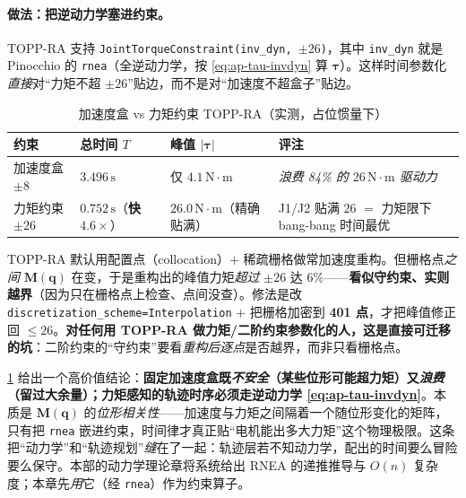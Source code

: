 \paragraph{做法：把逆动力学塞进约束。}
TOPP-RA 支持 \texttt{JointTorqueConstraint(inv\_dyn, $\pm 26$)}，其中 \texttt{inv\_dyn} 就是 Pinocchio 的 \texttt{rnea}（全逆动力学，按 \cref{eq:ap-tau-invdyn} 算 $\boldsymbol{\tau}$）。这样时间参数化\emph{直接}对“力矩不超 $\pm 26$”贴边，而不是对“加速度不超盒子”贴边。

\begin{table}[H]\centering\small
\caption{加速度盒 vs 力矩约束 TOPP-RA（实测，占位惯量下）}
\begin{tabular}{p{} p{} p{} p{}}
\toprule
约束 & 总时间 $T$ & 峰值 $|\boldsymbol{\tau}|$ & 评注 \\
\midrule
加速度盒 $\pm 8$ & $3.496\,\mathrm{s}$ & 仅 $4.1\,\mathrm{N\!\cdot\! m}$ & \emph{浪费 84\% 的 $26\,\mathrm{N\!\cdot\! m}$ 驱动力} \\
力矩约束 $\pm 26$ & $0.752\,\mathrm{s}$（\textbf{快 $4.6\times$}）& $26.0\,\mathrm{N\!\cdot\! m}$（精确贴满）& J1/J2 贴满 $26$ $=$ 力矩限下 bang-bang 时间最优 \\
\bottomrule
\end{tabular}
\label{tab:ap-topp}
\end{table}

\begin{pitfall}\label{pit:ap-topp-disc}
TOPP-RA 默认用配置点（collocation）$+$ 稀疏栅格做常加速度重构。但栅格点\emph{之间} $\mathbf{M}(\mathbf{q})$ 在变，于是重构出的峰值力矩\emph{超过} $\pm 26$ 达 $6\%$——\textbf{看似守约束、实则越界}（因为只在栅格点上检查、点间没查）。修法是改 \texttt{discretization\_scheme=Interpolation} $+$ 把栅格加密到 \textbf{401 点}，才把峰值修正回 $\le 26$。\textbf{对任何用 TOPP-RA 做力矩/二阶约束参数化的人，这是直接可迁移的坑}：二阶约束的“守约束”要看\emph{重构后逐点}是否越界，而非只看栅格点。
\end{pitfall}

\begin{insight}[力矩感知的时序必须走逆动力学]\label{ins:ap-torque-topp}
\cref{tab:ap-topp} 给出一个高价值结论：\textbf{固定加速度盒既\emph{不安全}（某些位形可能超力矩）又\emph{浪费}（留过大余量）；力矩感知的轨迹时序必须走逆动力学 \cref{eq:ap-tau-invdyn}}。本质是 $\mathbf{M}(\mathbf{q})$ 的\emph{位形相关性}——加速度与力矩之间隔着一个随位形变化的矩阵，只有把 \texttt{rnea} 嵌进约束，时间律才真正贴“电机能出多大力矩”这个物理极限。这条把“动力学”和“轨迹规划”\emph{缝}在了一起：轨迹层若不知动力学，配出的时间要么冒险要么保守。本部的动力学理论章将系统给出 RNEA 的递推推导与 $O(n)$ 复杂度；本章先\emph{用}它（经 \texttt{rnea}）作为约束算子。
\end{insight}

